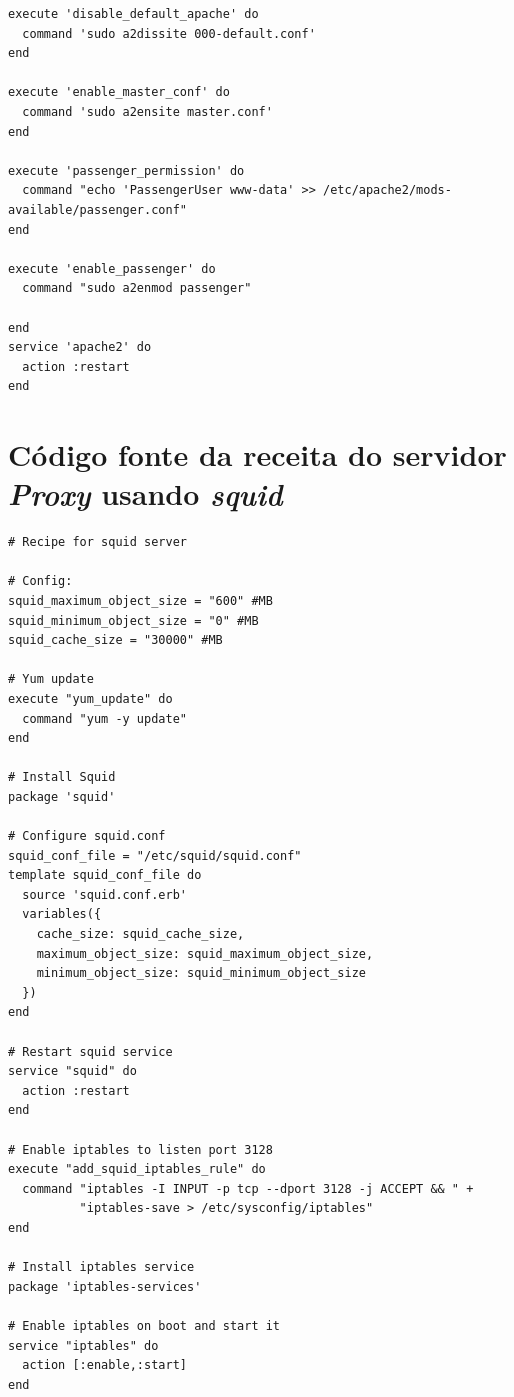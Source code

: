 \begin{apendicesenv}
\begin{lstlisting}
execute 'disable_default_apache' do
  command 'sudo a2dissite 000-default.conf'
end

execute 'enable_master_conf' do
  command 'sudo a2ensite master.conf'
end

execute 'passenger_permission' do
  command "echo 'PassengerUser www-data' >> /etc/apache2/mods-available/passenger.conf"
end

execute 'enable_passenger' do
  command "sudo a2enmod passenger"

end
service 'apache2' do
  action :restart
end 

\end{lstlisting}

\chapter{Código fonte da receita do servidor \textit{Proxy} usando \textit{squid}}\label{apendice}
\begin{lstlisting}
# Recipe for squid server

# Config: 
squid_maximum_object_size = "600" #MB
squid_minimum_object_size = "0" #MB
squid_cache_size = "30000" #MB

# Yum update
execute "yum_update" do
  command "yum -y update"
end

# Install Squid
package 'squid'

# Configure squid.conf
squid_conf_file = "/etc/squid/squid.conf"
template squid_conf_file do
  source 'squid.conf.erb'
  variables({
    cache_size: squid_cache_size,
    maximum_object_size: squid_maximum_object_size,
    minimum_object_size: squid_minimum_object_size
  })
end

# Restart squid service
service "squid" do
  action :restart
end

# Enable iptables to listen port 3128
execute "add_squid_iptables_rule" do
  command "iptables -I INPUT -p tcp --dport 3128 -j ACCEPT && " +
          "iptables-save > /etc/sysconfig/iptables"
end

# Install iptables service
package 'iptables-services'

# Enable iptables on boot and start it
service "iptables" do
  action [:enable,:start]
end

\end{lstlisting}

\end{apendicesenv}
